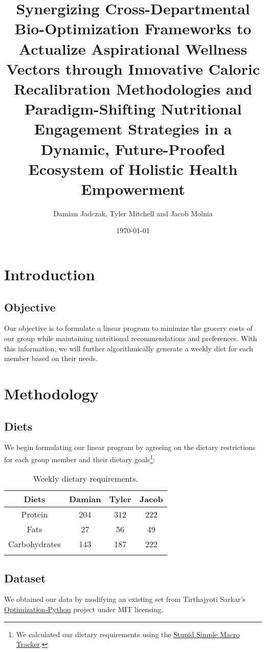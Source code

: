 \documentclass[12pt, english]{report}
\title{Synergizing Cross-Departmental Bio-Optimization Frameworks to Actualize Aspirational Wellness Vectors through Innovative Caloric Recalibration Methodologies and Paradigm-Shifting Nutritional Engagement Strategies in a Dynamic, Future-Proofed Ecosystem of Holistic Health Empowerment}
\author{Damian Jadczak, Tyler Mitchell and Jacob Molnia}
\date\today
\begin{document}
\maketitle
\tableofcontents
\pagebreak
\chapter{Introduction}
\vspace*{-1in}
\section{Objective}
Our objective is to formulate a linear program to minimize the grocery costs of our group while maintaining nutritional recommendations and preferences. With this information, we will further algorithmically generate a weekly diet for each member based on their needs.
\chapter{Methodology}
\vspace*{-1in}
\section{Diets}
We begin formulating our linear program by agreeing on the dietary restrictions for each group member and their dietary goals\footnote{We calculated our dietary requirements using the \href{https://apps.apple.com/us/app/stupid-simple-macro-tracker/id1210995590}{Stupid Simple Macro Tracker}.}:
\begin{table}[H]
    \centering
    \caption[short]{Weekly dietary requirements.}
    \begin{tabular}{cccc}
        \toprule
        Diets & Damian & Tyler & Jacob\\ 
        \midrule
        Protein & 204 &312 & 222 \\ 
        Fats &27 &56 & 49\\ 
        Carbohydrates &143 &187 & 222 \\
    \bottomrule
    \label{tab:diet}
    \end{tabular}
\end{table}
\section{Dataset}
We obtained our data by modifying an existing set from Tirthajyoti Sarkar's \href{https://github.com/tirthajyoti/Optimization-Python/blob/master/Data/diet.xls}{Optimization-Python} project under MIT licensing.
\pagebreak
\printbibliography
\end{document}

